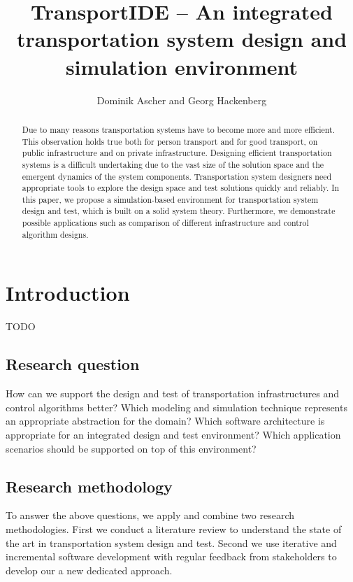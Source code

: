 \documentclass{IEEEtran}
\begin{document}
    \title{\textbf{TransportIDE} -- An integrated transportation system design and simulation environment}
    \author{Dominik Ascher and Georg Hackenberg}
    \maketitle
    
    \begin{abstract}
        Due to many reasons transportation systems have to become more and more efficient.
        This observation holds true both for person transport and for good transport, on public infrastructure and on private infrastructure.
        Designing efficient transportation systems is a difficult undertaking due to the vast size of the solution space and the emergent dynamics of the system components.
        Transportation system designers need appropriate tools to explore the design space and test solutions quickly and reliably.
        In this paper, we propose a simulation-based environment for transportation system design and test, which is built on a solid system theory.
        Furthermore, we demonstrate possible applications such as comparison of different infrastructure and control algorithm designs.
    \end{abstract}
    
    \section{Introduction}
    \label{sec:intro}
    TODO

    \newpage

    \subsection{Research question}
    How can we support the design and test of transportation infrastructures and control algorithms better?
    Which modeling and simulation technique represents an appropriate abstraction for the domain?
    Which software architecture is appropriate for an integrated design and test environment?
    Which application scenarios should be supported on top of this environment?

    \subsection{Research methodology}
    To answer the above questions, we apply and combine two research methodologies.
    First we conduct a literature review to understand the state of the art in transportation system design and test.
    Second we use iterative and incremental software development with regular feedback from stakeholders to develop our a new dedicated approach.
\end{document}
